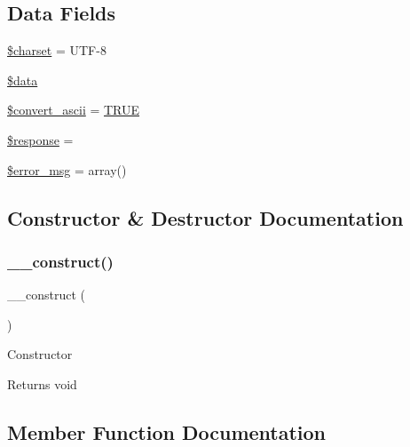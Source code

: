 \subsection*{Data Fields}
\begin{DoxyCompactItemize}
\item 
\mbox{\hyperlink{class_c_i___trackback_af10158dd74b75f1d337e83102d6b82ce}{\$charset}} = \textquotesingle{}U\+TF-\/8\textquotesingle{}
\item 
\mbox{\hyperlink{class_c_i___trackback_a6efc15b5a2314dd4b5aaa556a375c6d6}{\$data}}
\item 
\mbox{\hyperlink{class_c_i___trackback_a488490c694dfefb9578fb22e0208e008}{\$convert\+\_\+ascii}} = \mbox{\hyperlink{constants_8php_ae04a3efe6aa42044f803ee90c2277846}{T\+R\+UE}}
\item 
\mbox{\hyperlink{class_c_i___trackback_af4b6fb1bbc77ccc05f10da3b16935b99}{\$response}} = \textquotesingle{}\textquotesingle{}
\item 
\mbox{\hyperlink{class_c_i___trackback_acf910733622c1fa671b9f755c69c2ec7}{\$error\+\_\+msg}} = array()
\end{DoxyCompactItemize}


\subsection{Constructor \& Destructor Documentation}
\mbox{\label{class_c_i___trackback_a095c5d389db211932136b53f25f39685}} 
\subsubsection{\texorpdfstring{\+\_\+\+\_\+construct()}{\_\_construct()}}
{\footnotesize\ttfamily \+\_\+\+\_\+construct (\begin{DoxyParamCaption}{ }\end{DoxyParamCaption})}

Constructor

\begin{DoxyReturn}{Returns}
void 
\end{DoxyReturn}


\subsection{Member Function Documentation}
\mbox{\label{class_c_i___trackback_a0029bda7d34a222a5bda4ac894c31ac1}} 
